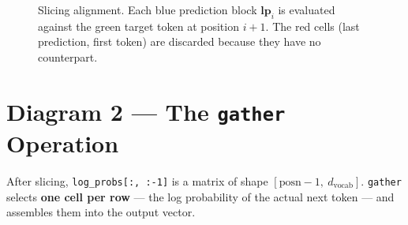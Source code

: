 \documentclass[10pt]{article}
\begin{document}
\begin{figure}[H]
\caption{Slicing alignment. Each blue prediction block $\mathbf{lp}_i$ is
evaluated against the green target token at position $i{+}1$.
The red cells (last prediction, first token) are discarded because they have
no counterpart.}
\end{figure}

\section{Diagram 2 --- The \texttt{gather} Operation}

After slicing, \texttt{log\_probs[:,~:-1]} is a matrix of shape
$[\text{posn}{-}1,\ d_\text{vocab}]$.
\texttt{gather} selects \textbf{one cell per row} --- the log probability of
the actual next token --- and assembles them into the output vector.
\end{document}

